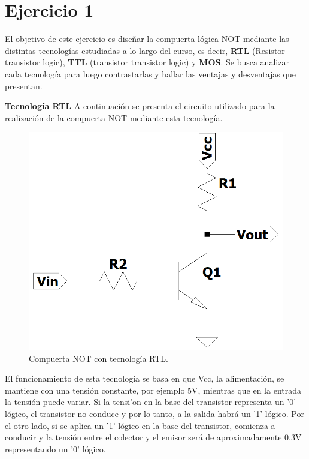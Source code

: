 \section{Ejercicio 1}
\noindent
El objetivo de este ejercicio es dise\~nar la compuerta l\'ogica NOT mediante las distintas tecnolog\'ias estudiadas a lo largo del curso, es decir, \textbf{RTL} (Resistor transistor logic), \textbf{TTL} (transistor transistor logic) y \textbf{MOS}. Se busca analizar cada tecnolog\'ia para luego contrastarlas y hallar las ventajas y desventajas que presentan. 
\vspace{10mm}


{\large\textbf{Tecnolog\'ia RTL}}
\noindent
A continuaci\'on se presenta el circuito utilizado para la realizaci\'on de la compuerta NOT mediante esta tecnolog\'ia.

\begin{figure}[h!]
\center
    \includegraphics[scale = 0.45]{figs/ej1/not_rtl.png}
    \caption{Compuerta NOT con tecnolog\'ia RTL.}
\label{fig:ej1_rtl}
\end{figure}
\noindent
El funcionamiento de esta tecnolog\'ia se basa en que Vcc, la alimentaci\'on, se mantiene con una tensi\'on constante, por ejemplo 5V, mientras que en la entrada la tensi\'on puede variar. Si la tensi'on en la base del transistor representa un '0' l\'ogico, el transistor no conduce y por lo tanto, a la salida habr\'a un '1' l\'ogico. Por el otro lado, si se aplica un '1' l\'ogico en la base del transistor, comienza a conducir y la tensi\'on entre el colector y el emisor ser\'a de aproximadamente 0.3V representando un '0' l\'ogico.

